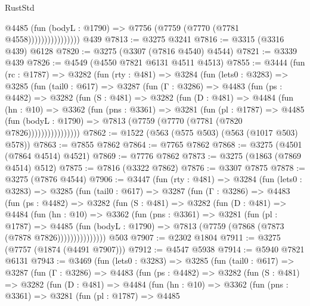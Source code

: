 \begin{lexlean}{RustStd}
\begin{coremodule}
                          @4485
                            (fun (bodyL : @1790) => @7756 (@7759 (@7770 (@7781 @4558))))))))))))))))
    @439
@7813 := @3275 @3241
@7816 := @3315 (@3316 @439) @6128
@7820 := @3275 (@3307 (@7816 @4540) @4544)
@7821 := @3339 @439
@7826 := @4549 (@4550 @7821 @6131 @4511 @4513)
@7855 := @3444
    (fun (rc : @1787) =>
    @3282
      (fun (rty : @481) =>
      @3284
        (fun (lets0 : @3283) =>
        @3285
          (fun (tail0 : @617) =>
          @3287
            (fun (Γ : @3286) =>
            @4483
              (fun (ps : @4482) =>
              @3282
                (fun (S : @481) =>
                @3282
                  (fun (D : @481) =>
                  @4484
                    (fun (hn : @10) =>
                    @3362
                      (fun (pns : @3361) =>
                      @3281
                        (fun (pl : @1787) =>
                        @4485
                          (fun (bodyL : @1790) =>
                          @7813 (@7759 (@7770 (@7781 (@7820 @7826))))))))))))))))
@7862 := @1522 (@563 (@575 @503) (@563 (@1017 @503) @578))
@7863 := @7855 @7862
@7864 := @7765 @7862
@7868 := @3275 (@4501 (@7864 @4514) @4521)
@7869 := @7776 @7862
@7873 := @3275 (@1863 (@7869 @4514) @512)
@7875 := @7816 (@3322 @7862)
@7876 := @3307 @7875
@7878 := @3275 (@7876 @4544)
@7906 := @3447
    (fun (rty : @481) =>
    @3284
      (fun (lets0 : @3283) =>
      @3285
        (fun (tail0 : @617) =>
        @3287
          (fun (Γ : @3286) =>
          @4483
            (fun (ps : @4482) =>
            @3282
              (fun (S : @481) =>
              @3282
                (fun (D : @481) =>
                @4484
                  (fun (hn : @10) =>
                  @3362
                    (fun (pns : @3361) =>
                    @3281
                      (fun (pl : @1787) =>
                      @4485
                        (fun (bodyL : @1790) =>
                        @7813 (@7759 (@7868 (@7873 (@7878 @7826)))))))))))))))
    @503
@7907 := @2302 @1804
@7911 := @3275 (@7757 (@1874 (@4491 @7907)))
@7912 := @4547 @5938
@7914 := @5940 @7821 @6131
@7943 := @3469
    (fun (lets0 : @3283) =>
    @3285
      (fun (tail0 : @617) =>
      @3287
        (fun (Γ : @3286) =>
        @4483
          (fun (ps : @4482) =>
          @3282
            (fun (S : @481) =>
            @3282
              (fun (D : @481) =>
              @4484
                (fun (hn : @10) =>
                @3362
                  (fun (pns : @3361) =>
                  @3281
                    (fun (pl : @1787) =>
                    @4485

\end{coremodule}
\end{lexlean}

